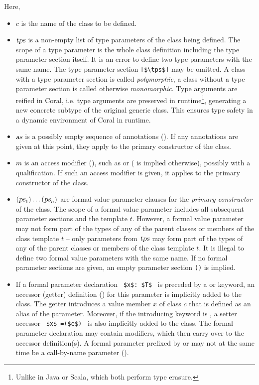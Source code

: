 Here, 
\begin{itemize}
\item[]
$c$ is the name of the class to be defined. 

\item[]
$\mbox{\sl tps}$ is a non-empty list of type parameters of the class being defined. The scope of a type parameter is the whole class definition including the type parameter section itself. It is an error to define two type parameters with the same name. The type parameter section \lstinline![$\tps$]! may be omitted. A class with a type parameter section is called {\em polymorphic}, a class without a type parameter section is called otherwise {\em monomorphic}. Type arguments are reified in Coral, i.e. type arguments are preserved in runtime\footnote{Unlike in Java or Scala, which both perform type erasure.}, generating a new concrete subtype of the original generic class. This ensures type safety in a dynamic environment of Coral in runtime. 

\item[]
$\mbox{\sl as}$ is a possibly empty sequence of annotations (). If any annotations are given at this point, they apply to the primary constructor of the class. 

\item[]
$m$ is an access modifier (), such as  or  ( is implied otherwise), possibly with a qualification. If such an access modifier is given, it applies to the primary constructor of the class. 

\item[]
$(\mbox{\sl ps}_1)\ldots(\mbox{\sl ps}_n)$ are formal value parameter clauses for the {\em primary constructor} of the class. The scope of a formal value parameter includes all subsequent parameter sections and the template $t$. However, a formal value parameter may not form part of the types of any of the parent classes or members of the class template $t$ -- only parameters from $\mbox{\sl tps}$ may form part of the types of any of the parent classes or members of the class template $t$. It is illegal to define two formal value parameters with the same name. If no formal parameter sections are given, an empty parameter section \lstinline!()! is implied. 

\item[]
If a formal parameter declaration ~\lstinline!$x$: $T$!~ is preceded by a  or  keyword, an accessor (getter) definition () for this parameter is implicitly added to the class. The getter introduces a value member $x$ of class $c$ that is defined as an alias of the parameter. Moreover, if the introducing keyword is , a setter accessor ~\lstinline!$x$_=($e$)!~ is also implicitly added to the class. The formal parameter declaration may contain modifiers, which then carry over to the accessor definition(s). A formal parameter prefixed by  or  may not at the same time be a call-by-name parameter (). 


\end{itemize}

